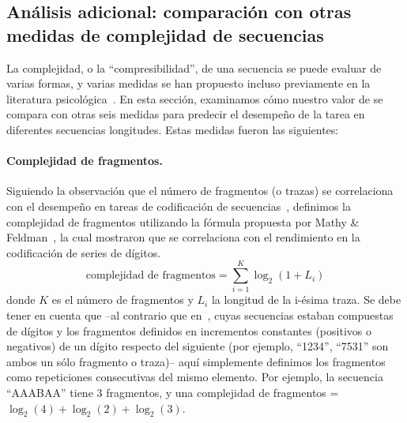 \subsection{Análisis adicional: comparación con otras medidas de complejidad de secuencias}
\label{BIN:AnalisisAdicional}

La complejidad, o la ``compresibilidad'', de una secuencia se puede evaluar de varias formas, y varias medidas se han propuesto incluso previamente en la literatura psicológica~\cite{f17,f30,f34,solomonoff1964formal,f44,f95,f96,f97,f98}. En esta sección, examinamos cómo nuestro valor de \mdlbin se compara con otras seis medidas para predecir el desempeño de la tarea en diferentes secuencias longitudes. Estas medidas fueron las siguientes:


\paragraph{Complejidad de fragmentos.} Siguiendo la observación que el número de fragmentos (o trazas) se correlaciona con el desempeño en tareas de codificación de secuencias~\cite{f34}, definimos la complejidad de fragmentos utilizando la fórmula propuesta por Mathy \& Feldman~\cite{f34}, la cual mostraron que se correlaciona con el rendimiento en la codificación de series de dígitos. 
$$
\text{complejidad de fragmentos} = \sum_{i = 1}^{K} \log_2(1+L_i) 
$$
donde $K$ es el número de fragmentos y $L_i$ la longitud de la i-ésima traza. Se debe tener en cuenta que --al contrario que en~\cite{f34}, cuyas secuencias estaban compuestas de dígitos y los fragmentos definidos en incrementos constantes (positivos o negativos) de un dígito respecto del siguiente (por ejemplo, ``1234'', ``7531'' son ambos un sólo fragmento o traza)-- aquí simplemente definimos los fragmentos como repeticiones consecutivas del mismo elemento. Por ejemplo, la secuencia ``AAABAA'' tiene 3 fragmentos, y una complejidad de fragmentos = $\log_2(4) + \log_2(2) + \log_2(3)$.

